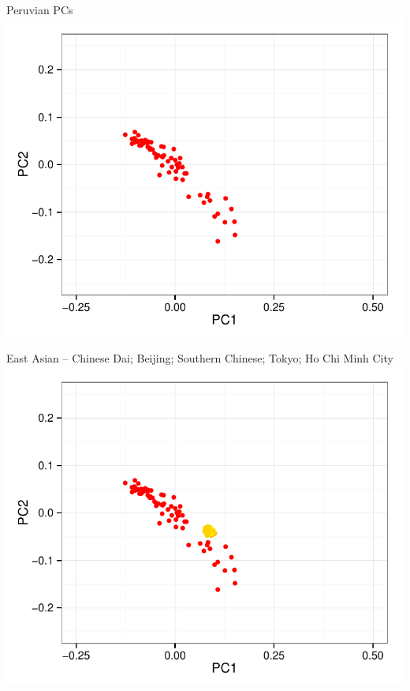 \documentclass[11pt,xcolor=table]{beamer}
\begin{document}
\begin{frame}{Peruvian PCs}
\centering
\includegraphics[width=1\textwidth]{pics/pel.pdf}
\end{frame}

\begin{frame}{\scriptsize{East Asian -- Chinese Dai; Beijing; Southern Chinese; Tokyo; Ho Chi Minh City}}
\centering
\includegraphics[width=1\textwidth]{pics/pel-EAS.pdf}
\end{frame}
\end{document}
